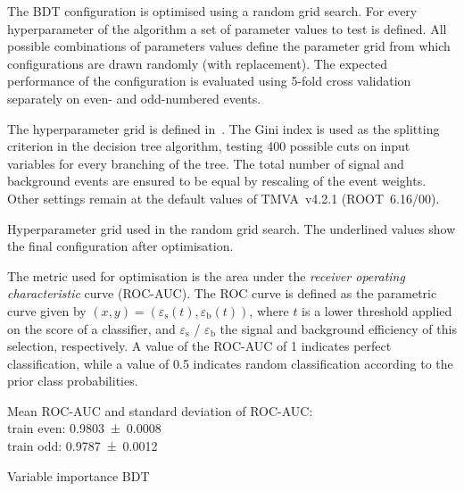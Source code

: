 The BDT configuration is optimised using a random grid search. For
every hyperparameter of the algorithm a set of parameter values to
test is defined. All possible combinations of parameters values define
the parameter grid from which configurations are drawn randomly (with
replacement). The expected performance of the configuration is
evaluated using 5-fold cross validation separately on even- and
odd-numbered events.

The hyperparameter grid is defined
in~. The Gini index is used as the
splitting criterion in the decision tree algorithm, testing 400
possible cuts on input variables for every branching of the tree. The
total number of signal and background events are ensured to be equal
by rescaling of the event weights. Other settings remain at the
default values of TMVA~v4.2.1 (ROOT~6.16/00).

\begin{table}[htbp]
  \centering
  
  \caption{Hyperparameter grid used in the random grid search. The
    underlined values show the final configuration after
    optimisation.}
  \label{tab:hyperparameter_grid_bdt}
\end{table}

The metric used for optimisation is the area under the \emph{receiver
  operating characteristic} curve (ROC-AUC). The ROC curve is defined
as the parametric curve given by
$(x, y) = \left( \varepsilon_{\text{s}}(t), \varepsilon_{\text{b}}(t)
\right)$, where $t$ is a lower threshold applied on the score of a
classifier, and $\varepsilon_\text{s}$ / $\varepsilon_\text{b}$ the
signal and background efficiency of this selection, respectively. A
value of the ROC-AUC of 1 indicates perfect classification, while a
value of 0.5 indicates random classification according to the prior
class probabilities.

Mean ROC-AUC and standard deviation of ROC-AUC:\\
train even: \num{0.9803 +- 0.0008}\\
train odd: \num{0.9787 +- 0.0012}





\begin{table}[htbp]
  \centering

  \caption{Variable importance BDT}
  \label{tab:variable_importance_bdt}
\end{table}





